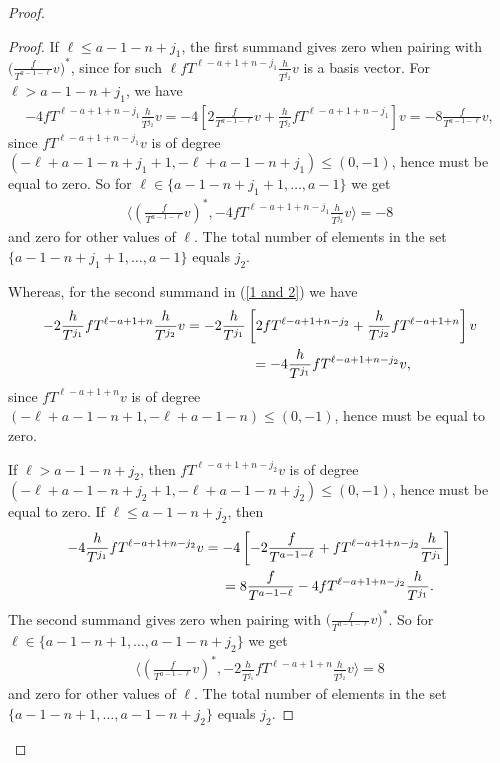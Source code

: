 \documentclass[11pt]{article}
\numberwithin{equation}{section}
\begin{document}
\begin{proof}
\begin{proof}
If $\ell \leq a-1-n+j_1$, the first summand gives zero when pairing with $\big(\frac{f}{T^{a-1-\ell}}v\big)^*$, since for such $\ell fT^{\ell-a+1+n-j_1} \frac{h}{T^{j_2}} v$ is a basis vector. For $\ell > a-1-n+j_1$, we have
\begin{gather*}
-4 fT^{\ell-a+1+n-j_1} \frac{h}{T^{j_2}} v = -4 \left[ 2 \frac{f}{T^{a-1-\ell}} v + \frac{h}{T^{j_2}} fT^{\ell-a+1+n-j_1} \right] v= -8 \frac{f}{T^{a-1-\ell}} v,
\end{gather*}
since $fT^{\ell-a+1+n-j_1}v$ is of degree $(-\ell+a-1-n + j_1 +1, -\ell+a-1-n+j_1) \leq (0, -1)$, hence must be equal to zero. So for $\ell \in \{a-1-n+j_1 +1, \dots, a-1\}$ we get
\begin{gather*}
\bigg\langle \left(\frac{f}{T^{a-1-\ell}}v\right)^*, -4 fT^{\ell-a+1+n-j_1} \frac{h}{T^{j_2}} v \bigg\rangle = -8
\end{gather*}
and zero for other values of $\ell$. The total number of elements in the set $\{a-1-n+j_1 +1, \dots, a-1\}$ equals $j_2$.

Whereas, for the second summand in (\ref{1 and 2}) we have
\begin{gather*}
-2 \frac{h}{T^{j_1}} fT^{\ell-a+1+n} \frac{h}{T^{j_2}} v = -2\frac{h}{T^{j_1}} \left[ 2 fT^{\ell-a+1+n - j_2} + \frac{h}{T^{j_2}} fT^{\ell-a+1+n} \right] v \\
\hphantom{-2 \frac{h}{T^{j_1}} fT^{\ell-a+1+n} \frac{h}{T^{j_2}} v } = -4 \frac{h}{T^{j_1}} fT^{\ell-a+1+n -j_2} v,
\end{gather*}
since $fT^{\ell-a+1+n} v$ is of degree $(-\ell+a-1-n+1, -\ell+a-1-n) \leq (0, -1)$, hence must be equal to zero.

If $\ell > a-1-n+j_2$, then $fT^{\ell-a+1+n-j_2} v$ is of degree $(-\ell+a-1-n+j_2 +1, -\ell+a-1-n+j_2) \leq (0, -1)$, hence must be equal to zero. If $\ell \leq a-1-n+j_2$, then
\begin{gather*}
-4 \frac{h}{T^{j_1}} fT^{\ell-a+1+n -j_2} v = -4 \left[ -2\frac{f}{T^{a-1-\ell}} + fT^{\ell-a+1+n - j_2} \frac{h}{T^{j_1}} \right] \\
\hphantom{-4 \frac{h}{T^{j_1}} fT^{\ell-a+1+n -j_2} v} = 8 \frac{f}{T^{a-1-\ell}} -4 fT^{\ell-a+1+n - j_2} \frac{h}{T^{j_1}}.
\end{gather*}
The second summand gives zero when pairing with $\big(\frac{f}{T^{a-1-\ell}}v\big)^*$. So for $\ell \in \{a-1-n+1, \dots, a-1-n+j_2 \}$ we get
\begin{gather*}
\bigg\langle \left(\frac{f}{T^{a-1-\ell}}v\right)^*, -2 \frac{h}{T^{j_1}} fT^{\ell-a+1+n} \frac{h}{T^{j_2}} v \bigg\rangle = 8
\end{gather*}
and zero for other values of $\ell$. The total number of elements in the set $\{a-1-n+1, \dots, a-1-n+j_2 \}$ equals $j_2$.


\end{proof}
\end{proof}
\end{document}
